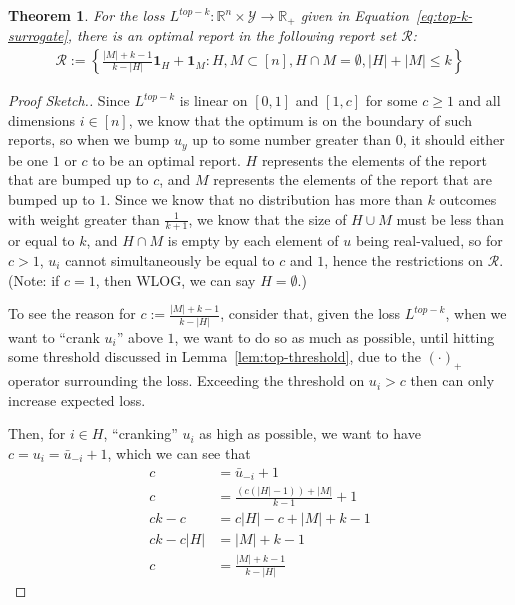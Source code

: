 \documentclass[12pt]{article}
\newcommand{\reals}{\mathbb{R}}
\newcommand{\R}{\mathcal{R}}
\newcommand{\Y}{\mathcal{Y}}
\newtheorem{theorem}{Theorem}
\begin{document}
\begin{theorem}\label{thm:finite-set}
	For the loss $L^{top-k} : \reals^n \times \Y \to \reals_+$ given in Equation~\ref{eq:top-k-surrogate}, there is an optimal report in the following report set $\R$:
	\begin{align*}
	\R := \left\{ \frac{|M| + k -1}{k - |H|} \mathbf{1}_H + \mathbf{1}_M : H, M \subset [n], H\cap M = \emptyset, |H| + |M| \leq k \right\}
	\end{align*}
\end{theorem}
\begin{proof}[Proof Sketch.]
	Since $L^{top-k}$ is linear on $[0,1]$ and $[1, c]$ for some $c \geq 1$ and all dimensions $i \in [n]$, we know that the optimum is on the boundary of such reports, so when we bump $u_y$ up to some number greater than $0$, it should either be one $1$ or $c$ to be an optimal report.
	$H$ represents the elements of the report that are bumped up to $c$, and $M$ represents the elements of the report that are bumped up to $1$.
	Since we know that no distribution has more than $k$ outcomes with weight greater than $\frac 1 {k+1}$, we know that the size of $H \cup M$ must be less than or equal to $k$, and $H \cap M$ is empty by each element of $u$ being real-valued, so for $c > 1$, $u_i$ cannot simultaneously be equal to $c$ and $1$, hence the restrictions on $\R$.
	(Note: if $c = 1$, then WLOG, we can say $H = \emptyset$.)
	
	To see the reason for $c := \frac{|M| + k -1}{k - |H|}$, consider that, given the loss $L^{top-k}$, when we want to ``crank $u_i$'' above $1$, we want to do so as much as possible, until hitting some threshold discussed in Lemma~\ref{lem:top-threshold}, due to the $(\cdot)_+$ operator surrounding the loss.
	Exceeding the threshold on $u_i > c$ then can only increase expected loss.
	
	Then, for $i \in H$, ``cranking'' $u_i$ as high as possible, we want to have $c = u_i = \bar u _{-i} + 1$, which we can see that 
	\begin{align*}
	c &= \bar u_{-i} + 1 \\
	c &= \frac{(c (|H|-1)) + |M|}{k-1} + 1\\
	ck-c &= c|H| - c + |M| + k - 1\\
	ck - c|H| &= |M| + k - 1\\
	c &= \frac{|M|+k-1}{k-|H|}
	\end{align*}
\end{proof}
\end{document}
